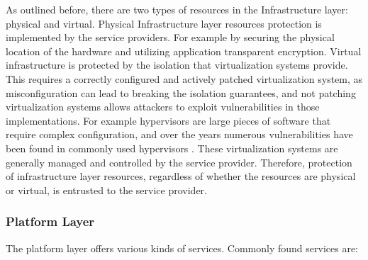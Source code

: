 As outlined before, there are two types of resources in the Infrastructure
layer: physical and virtual. Physical Infrastructure layer resources protection
is implemented by the service providers. For example by securing the physical
location of the hardware and utilizing application transparent encryption.
Virtual infrastructure is protected by the isolation that virtualization systems
provide. This requires a correctly configured and actively patched
virtualization system, as misconfiguration can lead to breaking the isolation
guarantees, and not patching virtualization systems allows attackers to exploit
vulnerabilities in those implementations. For example hypervisors are large
pieces of software that require complex configuration, and over the years
numerous vulnerabilities have been found in commonly used hypervisors
\cite{perezbotero2013hypervisorvulnerabilities,
  reuben2007surveyvirtualmachinesecurity}. These virtualization systems are
generally managed and controlled by the service provider. Therefore, protection
of infrastructure layer resources, regardless of whether the resources are
physical or virtual, is entrusted to the service provider.


\subsubsection{Platform Layer}

The platform layer offers various kinds of services. Commonly found services
are:

